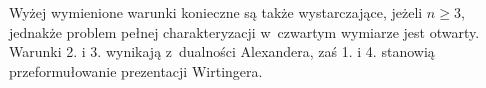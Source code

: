 Wyżej wymienione warunki konieczne są także wystarczające, jeżeli $n \ge 3$, jednakże problem pełnej charakteryzacji w~czwartym wymiarze jest otwarty.
Warunki 2. i 3. wynikają z~dualności Alexandera, zaś 1. i 4. stanowią przeformułowanie prezentacji Wirtingera.

